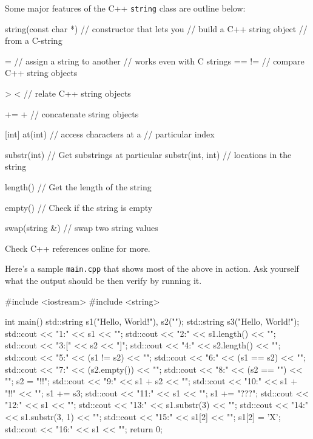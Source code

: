 Some major features of the C++ \texttt{string} class are outline below:
\begin{console}
string(const char *)    // constructor that lets you
                        // build a C++ string object
                        // from a C-string

=                       // assign a string to another
                        // works even with C strings
==     !=               // compare C++ string objects

>      <                // relate C++ string objects

+=     +                // concatenate string objects

[int]  at(int)          // access characters at a
                        // particular index

substr(int)             // Get substrings at particular
substr(int, int)        // locations in the string

length()                // Get the length of the string

empty()                 // Check if the string is empty

swap(string &)          // swap two string values\
\end{console}

Check C++ references online for more.

Here's a sample \texttt{main.cpp} that shows most of the
above in action. Ask yourself what the output should be then verify by
running it.

\begin{console}
#include <iostream>
#include <string>

int main()
{   
    std::string s1("Hello, World!"), s2("");
    std::string s3("Hello, World!");
    std::cout << "1:" << s1 << "\n";
    std::cout << "2:" << s1.length() << "\n";
    std::cout << "3:[" << s2 << "]\n";
    std::cout << "4:" << s2.length() << "\n";
    std::cout << "5:" << (s1 != s2) << "\n";
    std::cout << "6:" << (s1 == s2) << "\n";
    std::cout << "7:" << (s2.empty()) << "\n";
    std::cout << "8:" << (s2 == "") << "\n";
    s2 = "!!";
    std::cout << "9:" << s1 + s2 << "\n";
    std::cout << "10:" << s1 + "!!" << "\n";
    s1 += s3;
    std::cout << "11:" << s1 << "\n";
    s1 += "???";
    std::cout << "12:" << s1 << "\n";
    std::cout << "13:" << s1.substr(3) << "\n";
    std::cout << "14:" << s1.substr(3, 1) << "\n";
    std::cout << "15:" << s1[2] << "\n";
    s1[2] = 'X';
    std::cout << "16:" << s1 << "\n";
    return 0;
}
\end{console}

